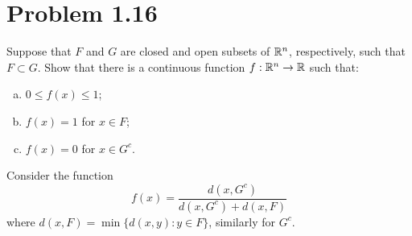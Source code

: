 \newpage
\section{Problem 1.16}
Suppose that $F$ and $G$ are closed and open subsets of $\mathbb{R}^n$, respectively, such that $F \subset G$. Show that there is a continuous function $f: \mathbb{R}^n \rightarrow \mathbb{R}$ such that:
\begin{enumerate}[(a)]
    \item $0 \leq f(x) \leq 1$;
    \item $f(x) = 1$ for $x \in F$;
    \item $f(x) = 0$ for $x \in G^c$.
\end{enumerate}
\partbreak
\begin{solution}
    Consider the function
    \[
    f(x) = \frac{d(x, G^c)}{d(x, G^c) + d(x, F)}
    \]
    where $d(x, F) = \min \{ d(x, y) : y \in F \}$, similarly for $G^c$. 
\end{solution}
